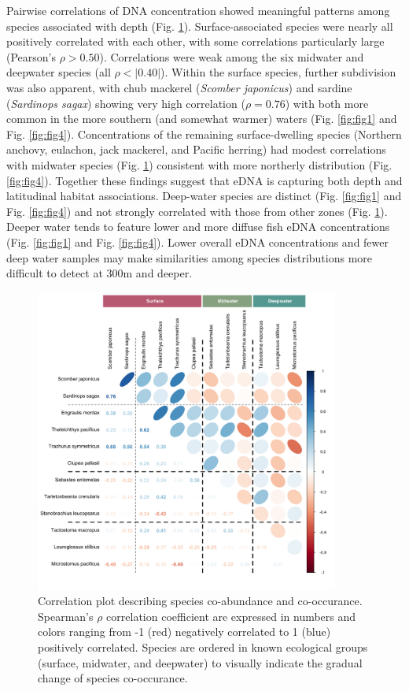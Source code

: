 \documentclass{article}
\begin{document}
Pairwise correlations of DNA concentration showed meaningful patterns among species associated with depth (Fig. \ref{fig:fig2}). Surface-associated species were nearly all positively correlated with each other, with some correlations particularly large (Pearson's $\rho > 0.50$). Correlations were weak among the six midwater and deepwater species (all $\rho < |0.40|$). Within the surface species, further subdivision was also apparent, with chub mackerel (\textit{Scomber japonicus}) and sardine (\textit{Sardinops sagax}) showing very high correlation ($\rho = 0.76$) with both more common in the more southern (and somewhat warmer) waters (Fig. \ref{fig:fig1} and Fig. \ref{fig:fig4}). Concentrations of the remaining surface-dwelling species (Northern anchovy, eulachon, jack mackerel, and Pacific herring) had modest correlations with midwater species (Fig. \ref{fig:fig2}) consistent with more northerly distribution (Fig. \ref{fig:fig4}). Together these findings suggest that eDNA is capturing both depth and latitudinal habitat associations. Deep-water species are distinct (Fig. \ref{fig:fig1} and Fig. \ref{fig:fig4}) and not strongly correlated with those from other zones (Fig. \ref{fig:fig2}). Deeper water tends to feature lower and more diffuse fish eDNA concentrations (Fig. \ref{fig:fig1} and Fig. \ref{fig:fig4}). Lower overall eDNA concentrations and fewer deep water samples may make similarities among species distributions more difficult to detect at 300m and deeper.

\begin{figure}[tbhp] 
\centering
\includegraphics[width=10cm]{plots/2_Figure_2.jpg}  
\caption{Correlation plot describing species co-abundance and co-occurance. Spearman’s $\rho$ correlation coefficient are expressed in numbers and colors ranging from -1 (red) negatively correlated to 1 (blue) positively correlated. Species are ordered in known ecological groups (surface, midwater, and deepwater) to visually indicate the gradual change of species co-occurance.}
\label{fig:fig2}
\end{figure}
\end{document}
